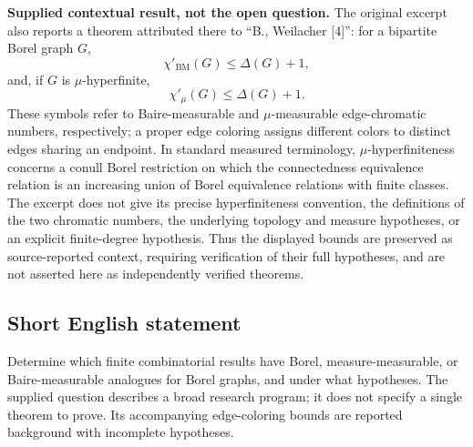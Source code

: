 \documentclass[11pt]{article}
\begin{document}
\textbf{Supplied contextual result, not the open question.} The original excerpt also reports a theorem attributed there to ``B., Weilacher [4]'': for a bipartite Borel graph \(G\),
\[
\chi'_{\mathrm{BM}}(G)\leq\Delta(G)+1,
\]
and, if \(G\) is \(\mu\)-hyperfinite,
\[
\chi'_{\mu}(G)\leq\Delta(G)+1.
\]
These symbols refer to Baire-measurable and \(\mu\)-measurable edge-chromatic numbers, respectively; a proper edge coloring assigns different colors to distinct edges sharing an endpoint. In standard measured terminology, \(\mu\)-hyperfiniteness concerns a conull Borel restriction on which the connectedness equivalence relation is an increasing union of Borel equivalence relations with finite classes. The excerpt does not give its precise hyperfiniteness convention, the definitions of the two chromatic numbers, the underlying topology and measure hypotheses, or an explicit finite-degree hypothesis. Thus the displayed bounds are preserved as source-reported context, requiring verification of their full hypotheses, and are not asserted here as independently verified theorems.
\subsection{Short English statement}
Determine which finite combinatorial results have Borel, measure-measurable, or Baire-measurable analogues for Borel graphs, and under what hypotheses. The supplied question describes a broad research program; it does not specify a single theorem to prove. Its accompanying edge-coloring bounds are reported background with incomplete hypotheses.
\end{document}
